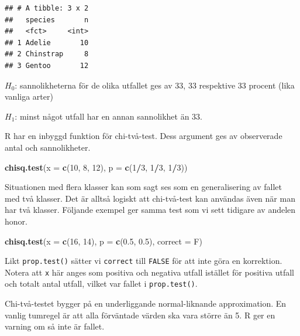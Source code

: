 \documentclass[
]{book}
\newenvironment{Shaded}{\begin{snugshade}}{\end{snugshade}}
\newcommand{\AttributeTok}[1]{\textcolor[rgb]{0.13,0.29,0.53}{#1}}
\newcommand{\DecValTok}[1]{\textcolor[rgb]{0.00,0.00,0.81}{#1}}
\newcommand{\FloatTok}[1]{\textcolor[rgb]{0.00,0.00,0.81}{#1}}
\newcommand{\FunctionTok}[1]{\textcolor[rgb]{0.13,0.29,0.53}{\textbf{#1}}}
\newcommand{\NormalTok}[1]{#1}
\newcommand{\SpecialCharTok}[1]{\textcolor[rgb]{0.81,0.36,0.00}{\textbf{#1}}}
\theoremstyle{definition}
\theoremstyle{definition}
\theoremstyle{definition}
\theoremstyle{definition}
\theoremstyle{remark}
\begin{document}
\begin{verbatim}
## # A tibble: 3 x 2
##   species       n
##   <fct>     <int>
## 1 Adelie       10
## 2 Chinstrap     8
## 3 Gentoo       12
\end{verbatim}

\(H_0\): sannolikheterna för de olika utfallet ges av 33, 33 respektive 33 procent (lika vanliga arter)

\(H_1\): minst något utfall har en annan sannolikhet än 33.

R har en inbyggd funktion för chi-två-test. Dess argument ges av observerade antal och sannolikheter.

\begin{Shaded}
\begin{Highlighting}[]
\FunctionTok{chisq.test}\NormalTok{(}\AttributeTok{x =} \FunctionTok{c}\NormalTok{(}\DecValTok{10}\NormalTok{, }\DecValTok{8}\NormalTok{, }\DecValTok{12}\NormalTok{), }\AttributeTok{p =} \FunctionTok{c}\NormalTok{(}\DecValTok{1}\SpecialCharTok{/}\DecValTok{3}\NormalTok{, }\DecValTok{1}\SpecialCharTok{/}\DecValTok{3}\NormalTok{, }\DecValTok{1}\SpecialCharTok{/}\DecValTok{3}\NormalTok{))}
\end{Highlighting}
\end{Shaded}

Situationen med flera klasser kan som sagt ses som en generalisering av fallet med två klasser. Det är alltså logiskt att chi-två-test kan användas även när man har två klasser. Följande exempel ger samma test som vi sett tidigare av andelen honor.

\begin{Shaded}
\begin{Highlighting}[]
\FunctionTok{chisq.test}\NormalTok{(}\AttributeTok{x =} \FunctionTok{c}\NormalTok{(}\DecValTok{16}\NormalTok{, }\DecValTok{14}\NormalTok{), }\AttributeTok{p =} \FunctionTok{c}\NormalTok{(}\FloatTok{0.5}\NormalTok{, }\FloatTok{0.5}\NormalTok{), }\AttributeTok{correct =}\NormalTok{ F)}
\end{Highlighting}
\end{Shaded}

Likt \texttt{prop.test()} sätter vi \texttt{correct} till \texttt{FALSE} för att inte göra en korrektion. Notera att \texttt{x} här anges som positiva och negativa utfall istället för positiva utfall och totalt antal utfall, vilket var fallet i \texttt{prop.test()}.

Chi-två-testet bygger på en underliggande normal-liknande approximation. En vanlig tumregel är att alla förväntade värden ska vara större än 5. R ger en varning om så inte är fallet.
\end{document}
